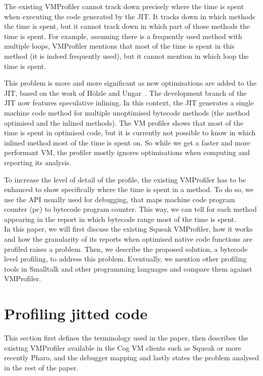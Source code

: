 \documentclass[10pt,nonatbib]{sigplanconf}
\begin{document}
The existing VMProfiler cannot track down precisely where the time is spent when executing the code generated by the JIT. It tracks down in which methods the time is spent, but it cannot track down in which part of those methods the time is spent. For example, assuming there is a frequently used method with multiple loops, VMProfiler mentions that most of the time is spent in this method (it is indeed frequently used), but it cannot mention in which loop the time is spent.

This problem is more and more significant as new optimisations are added to the JIT, based on the work of H\"olzle and Ungar~\cite{Holz94a}. The development branch of the JIT now features speculative inlining. In this context, the JIT generates a single machine code method for multiple unoptimised bytecode methods (the method optimised and the inlined methods). The VM profiler shows that most of the time is spent in optimised code, but it is currently not possible to know in which inlined method most of the time is spent on. So while we get a faster and more performant VM, the profiler mostly ignores optimisations when computing and reporting its analysis.

To increase the level of detail of the profile, the existing VMProfiler has to be enhanced to show specifically where the time is spent in a method. To do so, we use the API usually used for debugging, that maps machine code program counter (pc) to bytecode program counter. This way, we can tell for each method appearing in the report in which bytecode range most of the time is spent.\\

In this paper, we will first discuss the existing Squeak VMProfiler, how it works and how the granularity of its reports when optimised native code functions are profiled raises a problem. Then, we describe the proposed solution, a bytecode level profiling, to address this problem. Eventually, we mention other profiling tools in Smalltalk and other programming languages and compare them against VMProfiler.



\section{Profiling jitted code}

This section first defines the terminology used in the paper, then describes the existing VMProfiler available in the Cog VM clients such as Squeak or more recently Pharo, and the debugger mapping and lastly states the problem analysed in the rest of the paper.
\end{document}
